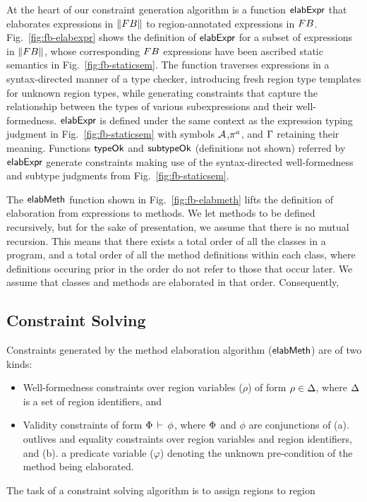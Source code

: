 At the heart of our constraint generation algorithm is a function
${\sf elabExpr}$ that elaborates expressions in $\left\| {\sc FB} \right\|$ to
region-annotated expressions in ${\sc FB}$. Fig.~\ref{fig:fb-elabexpr}
shows the definition of ${\sf elabExpr}$ for a subset of expressions in
$\left\| {\sc FB} \right\|$, whose corresponding ${\sc FB}$ expressions have been
ascribed static semantics in Fig.~\ref{fig:fb-staticsem}. The function
traverses expressions in a syntax-directed manner of a type checker,
introducing fresh region type templates for unknown region types,
while generating constraints that capture the relationship between the
types of various subexpressions and their well-formedness. ${\sf elabExpr}$
is defined under the same context as the expression typing judgment in
Fig.~\ref{fig:fb-staticsem} with symbols ${\mathcal{A}}$,$\pi^a$, and $\Gamma$
retaining their meaning. Functions ${\sf typeOk}$ and ${\sf subtypeOk}$
(definitions not shown) referred by ${\sf elabExpr}$ generate constraints
making use of the syntax-directed well-formedness and subtype
judgments from Fig.~\ref{fig:fb-staticsem}. 

The ${\sf elabMeth}$ function shown in Fig.~\ref{fig:fb-elabmeth} lifts the
definition of elaboration from expressions to methods. We let methods
to be defined recursively, but for the sake of presentation, we assume
that there is no mutual recursion. This means that there exists a
total order of all the classes in a program, and a total order of all
the method definitions within each class, where definitions occuring
prior in the order do not refer to those that occur later. We assume
that classes and methods are elaborated in that order. Consequently, 

\subsection{Constraint Solving}

Constraints generated by the method elaboration algorithm
(${\sf elabMeth}$) are of two kinds: 
\begin{itemize}
\item Well-formedness constraints over region variables ($\rho$) of
form $\rho \in \Delta$, where $\Delta$ is a set of region
identifiers, and 
\item Validity constraints of form $\Phi\,\vdash\,\phi$, where
$\Phi$ and $\phi$ are conjunctions of (a). outlives and equality
constraints over region variables and region identifiers, and (b).
a predicate variable ($\varphi$) denoting the unknown pre-condition
of the method being elaborated.
\end{itemize}
\noindent The task of a constraint solving algorithm is to assign
regions to region
